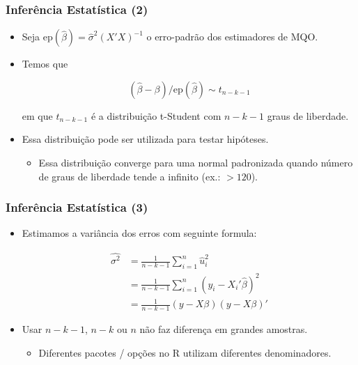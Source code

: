 \documentclass[10pt,slides,xcolor=pdftex,dvipsnames,table]{beamer}
\begin{document}
\begin{frame}[fragile]
	\frametitle{Inferência Estatística (2)}

\begin{itemize}\itemsep1.2em

\item Seja $\text{ep} (\widehat{\beta}) = \widehat{\sigma}^2 (X'X)^{-1}$ o erro-padrão dos estimadores de MQO.

\item Temos que

$$ (\widehat{\beta} - \beta) / \text{ep} (\widehat{\beta}) \sim t_{n-k-1} $$

em que $t_{n-k-1}$ é a distribuição t-Student com $n-k-1$ graus de liberdade.

\item Essa distribuição pode ser utilizada para testar hipóteses. 
\begin{itemize}
\item Essa distribuição converge para uma normal padronizada quando número de graus de liberdade tende a infinito (ex.: $> 120$). 
\end{itemize}

\end{itemize}

\end{frame}


\begin{frame}[fragile]
	\frametitle{Inferência Estatística (3)}

\begin{itemize}\itemsep1.2em

\item Estimamos a variância dos erros com seguinte formula: 

\begin{align*}
 \widehat{\sigma^2} &= \frac{1}{n-k-1} \sum_{i=1}^n \widehat{u}_i^2 \\
&= \frac{1}{n-k-1} \sum_{i=1}^n \left( y_i - X_i' \widehat{\beta} \right)^2 \\
&= \frac{1}{n-k-1} (y-X\beta) (y-X\beta)' 
\end{align*}

\item Usar $n-k-1$, $n-k$ ou $n$ não faz diferença em grandes amostras. 
\begin{itemize}
\item Diferentes pacotes / opções no R utilizam diferentes denominadores.
\end{itemize}  

\end{itemize}

\end{frame}
\end{document}
